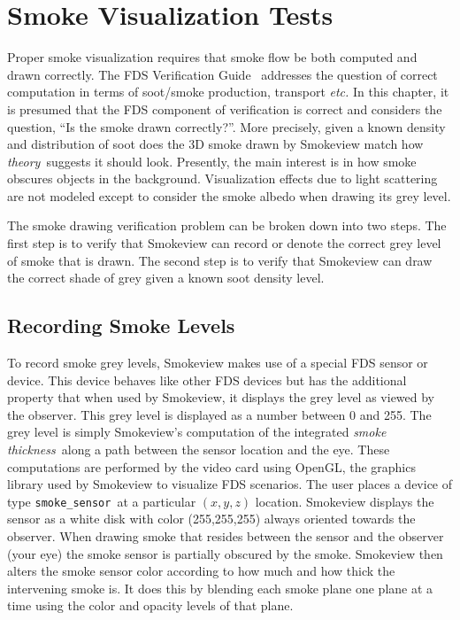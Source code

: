 \documentclass[11pt,twoside]{book}
\begin{document}
\chapter{Smoke Visualization Tests}

Proper smoke visualization requires that smoke flow be both computed and drawn correctly.
The FDS Verification Guide~\cite{FDS_Verification_Guide} addresses the question of correct
computation in terms of soot/smoke production, transport {\em etc.}  In this chapter, it is presumed that the FDS component of verification is correct and considers the question, ``Is the smoke drawn correctly?''.  More precisely, given a known density and distribution of soot does the 3D smoke drawn by Smokeview match how {\em theory}\ suggests it should look.  Presently, the main interest is in how smoke obscures objects in the background.  Visualization effects due to light scattering are not modeled except to consider the smoke albedo when drawing its grey level.

The smoke drawing verification problem can be broken down into two steps.  The first step is to verify that Smokeview can record or denote the correct grey level of smoke that is drawn.
The second step is to verify that Smokeview can draw the correct shade of grey given a known soot density level.

\section{Recording Smoke Levels}
To record smoke grey levels, Smokeview makes use of a special FDS sensor or device.
This device behaves like other FDS devices but has the additional property that when used by Smokeview, it displays the grey level as viewed by the observer.  This grey level is displayed as a number between 0 and 255.  The grey level is simply Smokeview's computation of the integrated {\em smoke thickness}\ along a path between the sensor location and the eye.  These computations are performed by the video card using OpenGL, the graphics library used by Smokeview to visualize FDS scenarios.  The user places a device of type {\tt smoke\_sensor}\ at a particular $(x, y, z)$ location.
Smokeview displays the sensor as a white disk with color (255,255,255) always oriented towards the observer. When drawing smoke that resides between the sensor and the observer (your eye) the smoke sensor is partially obscured by the smoke.  Smokeview then alters the smoke sensor color according to how much and how thick the intervening smoke is.  It does this by blending each smoke plane one plane at a time using the color and opacity levels of that plane.
\end{document}

